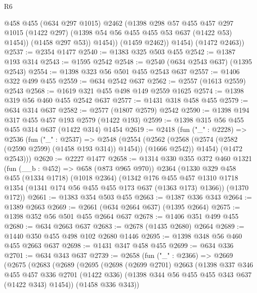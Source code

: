 \begin{lexlean}{R6}
\begin{coremodule}
                @458
                @455
                (@634 @297 @1015)
                @2462
                (@1398
                  @298
                  @57
                  @455
                  @457
                  @297
                  @1015
                  (@1422 @297)
                  (@1398 @54 @56 @455 @455 @53 @637 (@1422 @53) @1454))
                (@1458 @297 @53))
              @1454))
          (@1459 @2462))
        @1454)
      (@1472 @2463))
@2537 := @2354 @1477
@2540 := @1383 @325 @503 @455
@2542 := @1387 @193 @314
@2543 := @1595 @2542
@2548 := @2540 (@634 @2543 @637) (@1395 @2543)
@2554 := @1398 @323 @56 @501 @455 @2543 @637
@2557 := @1406 @322 @499 @455
@2559 := @634 @2542 @637
@2562 := @2557 (@1613 @2559) @2543
@2568 := @1619 @321 @455 @498 @149 @2559 @1625
@2574 := @1398 @319 @56 @460 @455 @2542 @637
@2577 := @1431 @318 @458 @455
@2579 := @634 @314 @637
@2582 := @2577 (@1807 @2579) @2542
@2590 := @1398 @194 @317 @455 @457 @193 @2579 (@1422 @193)
@2599 := @1398 @315 @56 @455 @455 @314 @637 (@1422 @314) @1454
@2619 := @2418
    (fun ("_" : @2228) =>
    @2536
      (fun ("_" : @2537) =>
      @2548
        (@2554
          (@2562 (@2568 (@2574 (@2582 (@2590 @2599) (@1458 @193 @314)) @1454)) (@1666 @2542))
          @1454)
        (@1472 @2543)))
@2620 := @2227 @1477
@2658 := @1314
    @330
    @355
    @372
    @460
    @1321
    (fun (__b : @452) => @658 (@873 @965 @970))
    @2364
    (@1330
      @329
      @458
      @455
      (@1334 @1718)
      (@1018 @2364)
      (@1342
        @176
        @455
        @457
        @1310
        @1718
        @1354
        (@1341 @174 @56 @455 @455 @173 @637 (@1363 @173) @1366))
      (@1370 @172))
@2661 := @1383 @354 @503 @455
@2663 := @1387 @336 @343
@2664 := @1389 @2663
@2669 := @2661 (@634 @2664 @637) (@1395 @2664)
@2675 := @1398 @352 @56 @501 @455 @2664 @637
@2678 := @1406 @351 @499 @455
@2680 := @634 @2663 @637
@2683 := @2678 (@1435 @2680) @2664
@2689 := @1440 @350 @455 @498 @102 @2680 @1446
@2695 := @1398 @348 @56 @460 @455 @2663 @637
@2698 := @1431 @347 @458 @455
@2699 := @634 @336
@2701 := @634 @343 @637
@2739 := @2658
    (fun ("_" : @2366) =>
    @2669
      (@2675
        (@2683
          (@2689
            (@2695
              (@2698
                (@2699 @2701)
                @2663
                (@1398
                  @337
                  @346
                  @455
                  @457
                  @336
                  @2701
                  (@1422 @336)
                  (@1398 @344 @56 @455 @455 @343 @637 (@1422 @343) @1454))
                (@1458 @336 @343))

\end{coremodule}
\end{lexlean}
